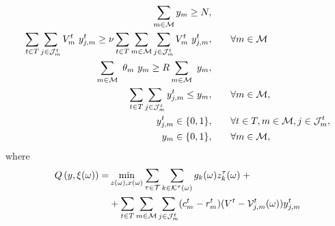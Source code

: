 \documentclass[a4paper,11pt]{article}
\begin{document}
	\begin{alignat}{2}
		\sum\limits_{m \in \cal {M}} y_{m}\geq{N}, & \qquad
		\label{eq3}\\
		\sum\limits_{t \in T} \sum\limits_{j \in {\cal J}^t_{m}} V_{m}^{t} \ y_{j,m}^{t} \geq \nu \sum\limits_{t \in T} \sum\limits_{m \in {\cal M}} \sum\limits_{j \in {\cal J}^t_{m}} V_{m}^{t} \ y_{j,m}^{t}, & \qquad \forall m \in {\cal M}
		\label{eq3.2}\\
		\sum\limits_{m \in {{\cal M}}} \ \theta_{m} \ y_{m}  \geq {R} \sum\limits_{m \in {\cal M}} \ y_{m}, & \qquad \label{eq4}\\
		\sum\limits_{t \in T} \sum\limits_{j \in {\cal J}^t_{m}} y_{j,m}^{t} \leq y_{m}, & \qquad \forall m \in \cal M, \label{eq5}\\
		y_{j,m}^t \in \{0, 1\}, & \qquad \forall t \in T, m \in {\cal M}, j \in {\cal J}^t_{m}, \label{eq6}\\
		y_{m} \in \{0, 1\}, & \qquad \forall m \in \cal M \label{eq7},
	\end{alignat}
	\noindent where  
	\begin{equation}
		\begin{split}
			Q \left(y,\xi (\omega)\right) = & \min_{z(\omega), x(\omega)} 
			\sum\limits_{\tau \in \cal T}\sum\limits_{k \in \cal K^{\tau}(\omega)} g_k(\omega) z_k^{\tau}(\omega) \; + \\
			& + \sum\limits_{t \in T} \sum\limits_{m \in {\cal M}} \sum\limits_{j \in {\cal J}^t_{m}} (c_{m}^t-r_{m}^t)(V^{t} - {\cal V}_{j,m}^t(\omega)) y_{j,m}^t \label{eq8}
		\end{split}
	\end{equation}
\end{document}
